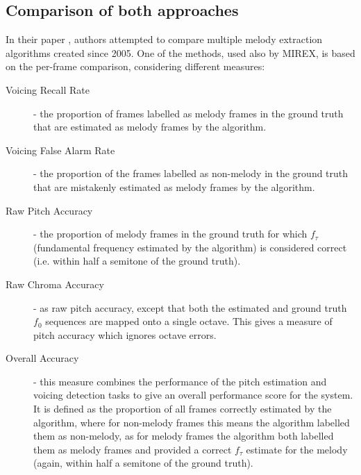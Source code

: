 \vspace{10pt}

\subsection{Comparison of both approaches}

In their paper \cite{comparison}, authors attempted to compare multiple melody extraction algorithms created since 2005. One of the methods, used also by MIREX, is based on the per-frame comparison, considering different measures:

\begin{description}
\item[Voicing Recall Rate] - the proportion of frames labelled as melody frames in the ground truth that are estimated as melody frames by the algorithm.
\item[Voicing False Alarm Rate] - the proportion of the frames labelled as non-melody in the ground truth that are mistakenly estimated as melody frames by the algorithm.
\item[Raw Pitch Accuracy] - the proportion of melody frames in the ground truth for which $f_{\tau}$ (fundamental frequency estimated by the algorithm) is considered correct (i.e. within half a semitone of the ground truth). 
\item[Raw Chroma Accuracy] - as raw pitch accuracy, except that both the estimated and ground truth $f_{0}$ sequences are mapped onto a single octave. This gives a measure of pitch accuracy which ignores octave errors.
\item[Overall Accuracy] - this measure combines the performance of the pitch estimation and voicing detection tasks to give an overall performance score for the system. It is defined as the proportion of all frames correctly estimated by the algorithm, where for non-melody frames this means the algorithm labelled them as non-melody, as for melody frames the algorithm both labelled them as melody frames and provided a correct $f_{\tau}$ estimate for the melody (again, within half a semitone of the ground truth).
\end{description}



